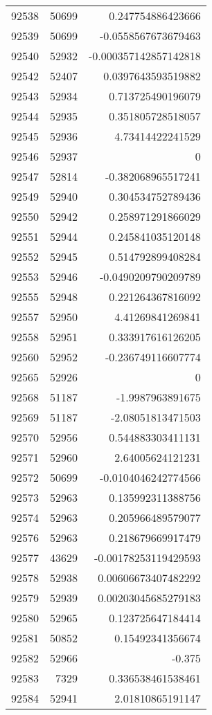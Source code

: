 \begin{tabular}{r | r | r}
92538 & 50699 & 0.247754886423666 \\
92539 & 50699 & -0.0558567673679463 \\
92540 & 52932 & -0.000357142857142818 \\
92542 & 52407 & 0.0397643593519882 \\
92543 & 52934 & 0.713725490196079 \\
92544 & 52935 & 0.351805728518057 \\
92545 & 52936 & 4.73414422241529 \\
92546 & 52937 & 0 \\
92547 & 52814 & -0.382068965517241 \\
92549 & 52940 & 0.304534752789436 \\
92550 & 52942 & 0.258971291866029 \\
92551 & 52944 & 0.245841035120148 \\
92552 & 52945 & 0.514792899408284 \\
92553 & 52946 & -0.0490209790209789 \\
92555 & 52948 & 0.221264367816092 \\
92557 & 52950 & 4.41269841269841 \\
92558 & 52951 & 0.333917616126205 \\
92560 & 52952 & -0.236749116607774 \\
92565 & 52926 & 0 \\
92568 & 51187 & -1.9987963891675 \\
92569 & 51187 & -2.08051813471503 \\
92570 & 52956 & 0.544883303411131 \\
92571 & 52960 & 2.64005624121231 \\
92572 & 50699 & -0.0104046242774566 \\
92573 & 52963 & 0.135992311388756 \\
92574 & 52963 & 0.205966489579077 \\
92576 & 52963 & 0.218679669917479 \\
92577 & 43629 & -0.00178253119429593 \\
92578 & 52938 & 0.00606673407482292 \\
92579 & 52939 & 0.00203045685279183 \\
92580 & 52965 & 0.123725647184414 \\
92581 & 50852 & 0.15492341356674 \\
92582 & 52966 & -0.375 \\
92583 & 7329 & 0.336538461538461 \\
92584 & 52941 & 2.01810865191147 \\

\end{tabular}
